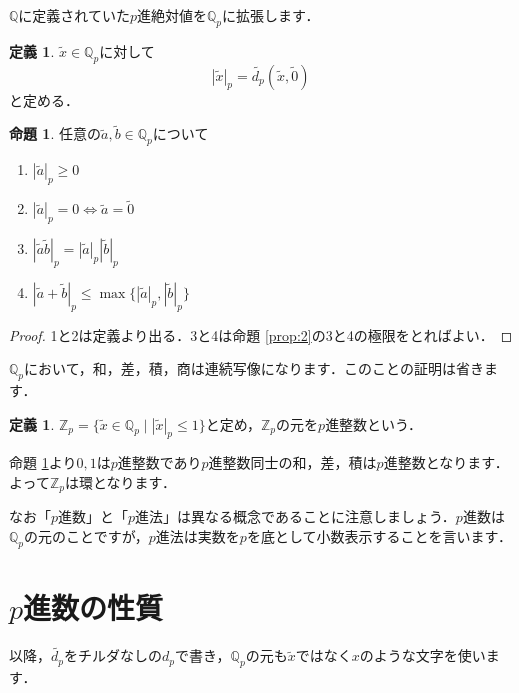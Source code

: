 \documentclass[uplatex]{jsarticle}
\newcommand{\Z}{\mathbb{Z}}
\newcommand{\Q}{\mathbb{Q}}
\theoremstyle{definition} %
\newtheorem{defi}[thm]{定義}
\newtheorem{prop}[thm]{命題}
\begin{document}
$\Q$に定義されていた$p$進絶対値を$\Q_p$に拡張します．

\begin{oframed}\begin{defi}
$\tilde{x} \in \Q_p$に対して
\[|\tilde{x}|_p = \tilde{d_p}(\tilde{x}, \tilde{0})\]
と定める．
\end{defi}\end{oframed}

\begin{oframed}\begin{prop}\label{prop:4}
任意の$\tilde{a}, \tilde{b} \in \Q_p$について
\begin{enumerate}
\item $|\tilde{a}|_p \geq 0$
\item $|\tilde{a}|_p = 0 \iff \tilde{a} = \tilde{0}$
\item $|\tilde{a}\tilde{b}|_p = |\tilde{a}|_p  |\tilde{b}|_p$
\item $|\tilde{a}+\tilde{b}|_p \leq \max\{|\tilde{a}|_p, |\tilde{b}|_p\}$
\end{enumerate}
\end{prop}\end{oframed}
\begin{proof}
1と2は定義より出る．3と4は命題 \ref{prop:2}の3と4の極限をとればよい．
\end{proof}

$\Q_p$において，和，差，積，商は連続写像になります．このことの証明は省きます．

\begin{oframed}\begin{defi}
$\Z_p = \{\tilde{x} \in \Q_p \mid |\tilde{x}|_p \le 1 \}$と定め，$\Z_p$の元を$p$進整数という．
\end{defi}\end{oframed}

命題 \ref{prop:4}より$0, 1$は$p$進整数であり$p$進整数同士の和，差，積は$p$進整数となります．よって$\Z_p$は環となります．

なお「$p$進数」と「$p$進法」は異なる概念であることに注意しましょう．$p$進数は$\Q_p$の元のことですが，$p$進法は実数を$p$を底として小数表示することを言います．

\section{$p$進数の性質}

以降，$\tilde{d_p}$をチルダなしの$d_p$で書き，$\Q_p$の元も$\tilde{x}$ではなく$x$のような文字を使います．
\end{document}
